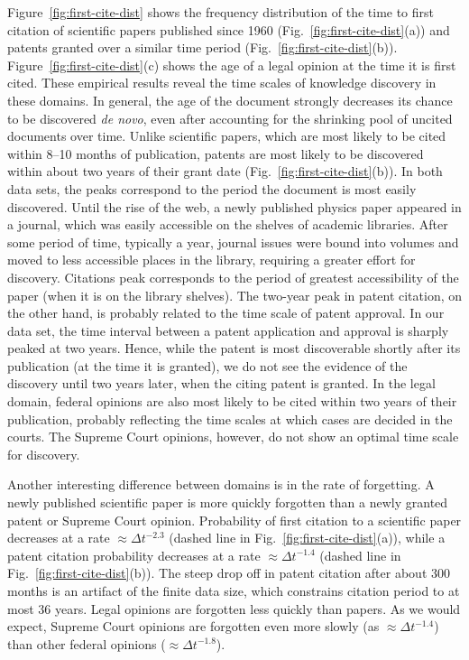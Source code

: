\documentclass[10pt]{bmc_article}
\newenvironment{bmcformat}{\baselineskip20pt\sloppy\setboolean{publ}{false}}{\baselineskip20pt\sloppy}
\begin{document}
\begin{bmcformat}
Figure~\ref{fig:first-cite-dist} shows the frequency distribution of the time to first citation of scientific papers published since 1960 (Fig.~\ref{fig:first-cite-dist}(a)) and patents granted over a similar time period (Fig.~\ref{fig:first-cite-dist}(b)). Figure~\ref{fig:first-cite-dist}(c) shows the age of a legal opinion at the time it is first cited.
These empirical results reveal the time scales of knowledge discovery in these domains. In general, the age of the document strongly decreases its chance to be discovered \emph{de novo}, even after accounting for the shrinking pool of uncited documents over time.
Unlike scientific papers, which are most likely to be cited within 8--10 months of publication, patents are most likely to be discovered within about two years of their grant date (Fig.~\ref{fig:first-cite-dist}(b)). In both data sets, the peaks correspond to the period the document is most easily discovered.  Until the rise of the web, a newly published physics paper appeared in a journal, which was easily accessible on the shelves of academic libraries. After some period of time, typically a year, journal issues were bound into volumes and moved to less accessible places in the library, requiring a greater effort for discovery. Citations peak corresponds to the period of greatest accessibility of the paper (when it is on the library shelves). The two-year peak in patent citation, on the other hand, is probably related to the time scale of patent approval. In our data set, the time interval between a patent application and approval is sharply peaked at two years. Hence, while the patent is most discoverable shortly after its publication (at the time it is granted), we do not see the evidence of the discovery until two years later, when the citing patent is granted.
In the legal domain, federal opinions are also most likely to be cited within two years of their publication, probably reflecting the time scales at which cases are decided in the courts. The Supreme Court opinions, however, do not show an optimal time scale for discovery.


Another interesting difference between domains is in the rate of forgetting. A newly published scientific paper is more quickly forgotten than a newly granted patent or Supreme Court opinion. Probability of first citation to a scientific paper decreases at a rate $\approx \Delta t^{-2.3}$ (dashed line in Fig.~\ref{fig:first-cite-dist}(a)), while a patent citation probability decreases at a rate $\approx \Delta t^{-1.4}$ (dashed line in Fig.~\ref{fig:first-cite-dist}(b)). The steep drop off in patent citation after about 300 months is an artifact of the finite data size, which constrains citation period to at most 36 years.
Legal opinions are forgotten less quickly than papers. As we would expect, Supreme Court opinions are forgotten even more slowly (as $\approx \Delta t^{-1.4}$) than other federal opinions ($\approx \Delta t^{-1.8}$).



\end{bmcformat}
\end{document}
